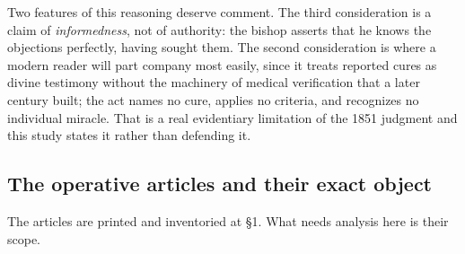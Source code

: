 Two features of this reasoning deserve comment. The third
consideration is a claim of \emph{informedness}, not of authority:
the bishop asserts that he knows the objections perfectly, having
sought them. The second consideration is where a modern reader will
part company most easily, since it treats reported cures as divine
testimony without the machinery of medical verification that a later
century built; the act names no cure, applies no criteria, and
recognizes no individual miracle. That is a real evidentiary
limitation of the 1851 judgment and this study states it rather than
defending it.

\subsection{The operative articles and their exact object}

The articles are printed and inventoried at \S1. What needs analysis
here is their scope.

